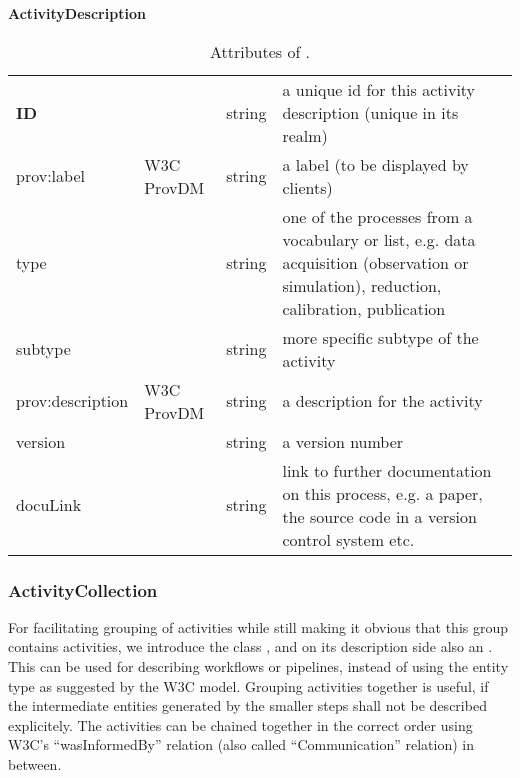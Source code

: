 \begin{table}[ht]
\small
{}\textwidth
\textbf{\normalsize ActivityDescription}\vspace{0.25em}\\
\begin{tabulary}{1.0\textwidth}{@{}lp{2.5cm}lL@{}}
\toprule
{} &  &  & \\
\midrule
\textbf{ID} &   & string & a unique id for this activity description (unique in its realm)\\
prov:label        & W3C ProvDM  & string & a label (to be displayed by clients)\\
type         & & string & one of the processes from a vocabulary or list, e.g. data acquisition (observation or simulation), reduction, calibration, publication\\
subtype  & & string & more specific subtype of the activity\\
prov:description & W3C ProvDM & string & a description for the activity\\
version & & string & a version number\\
docuLink & & string & link to further documentation on this process, e.g. a paper, the source code in a version control system etc.\\
\bottomrule
\end{tabulary}
\caption{Attributes of .}
\end{table}


\subsubsection{ActivityCollection}\label{sec:activity-collection}
For facilitating grouping of activities while still making it obvious that this 
group contains activities, we introduce the class , 
and on its description side also an . 
This can be used for describing workflows or pipelines, instead of using the 
entity type  as suggested by the W3C model.
Grouping activities together is useful, if the intermediate entities generated 
by the smaller steps shall not be described explicitely. 
The activities can be chained together in the correct order using 
W3C's ``wasInformedBy'' relation (also called ``Communication'' relation) 
in between.



